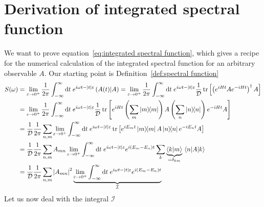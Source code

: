 \chapter{Derivation of integrated spectral function\label{app:spectral}}
\thispagestyle{chapterBeginStyle}
We want to prove equation~\eqref{eq:integrated spectral function}, which gives
a recipe for the numerical calculation of the integrated spectral function for an arbitrary observable \(A\).
Our starting point is Definition~\ref{def:spectral function}
\begin{align}
        S(\omega) &=  \lim _{\varepsilon \to 0^+} \frac{1}{2 \pi} \int_{-\infty}^{\infty} \mathrm{d} t 
        \; e^{i \omega t-|t| \varepsilon}\hs{A(t)}{A} = \lim _{\varepsilon \to 0^+} \frac{1}{2 \pi}
        \int_{-\infty}^{\infty} \mathrm{d} t \; e^{i \omega t-|t| \varepsilon} \frac{1}{\dimension}
        \tr\left[\left(e^{iHt}Ae^{-iHt}\right)^{\dagger}A\right] \nonumber\\
        &=\lim _{\varepsilon \to 0^+} \frac{1}{2 \pi}
        \int_{-\infty}^{\infty} \mathrm{d} t \; e^{i \omega t-|t| \varepsilon} \frac{1}{\dimension}
        \tr\left[e^{iHt}\left(\sum_{m} \ketbra{m}{m}\right) 
        A\left(\sum_{n} \ketbra{n}{n}\right)e^{-iHt}A\right] \nonumber\\
        &= \frac{1}{\dimension} \frac{1}{2 \pi}\sum_{n,m} \lim _{\varepsilon \to 0^+} 
        \int_{-\infty}^{\infty} \mathrm{d} t \; e^{i \omega t-|t| \varepsilon}
        \tr\left[e^{i E_m t}\ketbra{m}{m} A\ketbra{n}{n}e^{-i E_n t}A\right] \nonumber\\
        &= \frac{1}{\dimension} \frac{1}{2 \pi}\sum_{n,m} A_{mn}  \lim _{\varepsilon \to 0^+} 
        \int_{-\infty}^{\infty} \mathrm{d} t \; e^{i \omega t-|t| \varepsilon}e^{i (E_m-E_n) t}
        \sum_{k} \underbrace{\braket{k}{m}}_{=\delta_{km}} \matrixel{n}{A}{k} \nonumber\\
        &= \frac{1}{\dimension} \frac{1}{2 \pi}\sum_{n,m} \abs{A_{mn}}^2  \underbrace{\lim _{\varepsilon 
        \to 0^+} \int_{-\infty}^{\infty} \mathrm{d} t \; e^{i \omega t-|t| 
        \varepsilon}e^{i (E_m-E_n) t}}_{\mathcal{I}}\label{eq:spectral function simplified}
\end{align}
Let us now deal with the integral \(\mathcal{I}\)
